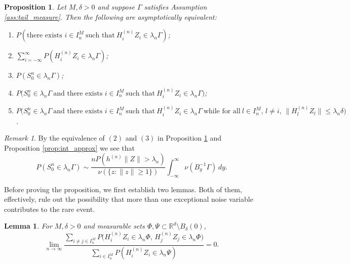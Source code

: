 \documentclass[11pt,reqno]{amsart}
\numberwithin{equation}{section}
\newcommand{\notes}[1]{{\color{brown}  {Notes: #1}}}
\newtheorem{lemma}{Lemma}[section] %
\newtheorem{proposition}{Proposition}
\theoremstyle{definition}
\theoremstyle{remark}
\newtheorem{remark}{Remark}[section]
\theoremstyle{definition}
\newcommand{\RR}{\mathbb{R}}
\begin{document}
\begin{proposition}\label{prop:asym_prob_equi}
   Let \( M, \delta  > 0 \) and suppose $\Gamma$  
satisfies Assumption \ref{ass:tail_measure}. Then the following are
asymptotically equivalent: 



    \begin{enumerate} 
     \item $P(\text{there exists } i \in I_n^M \ \text{such that} \
       H_{i}^{(n)} Z_i \in \lambda_n \Gamma)$; 
        \item $\sum_{i = -\infty}^\infty P(H_{i}^{(n)} Z_i \in
          \lambda_n \Gamma)$; 
        \item $P(S_0^n \in \lambda_n \Gamma) $; 
        \item $P\bigl(S_0^n \in \lambda_n \Gamma \ \text{and there exists }
          i\in I_n^M \ \text{such that} \ H_i^{(n)} Z_i\in \lambda_n
          \Gamma\bigr)$;         
        \item 
$P\bigl(S_0^n \in \lambda_n\Gamma \ \text{and there exists } i\in
I_n^M \ \text{such that} \ H_i^{(n)} Z_i \in \lambda_n \Gamma \ \text{while
  for all} \   l\in I_n^M, \, l\neq i, \, \|H_l^{(n)} Z_l\| \leq \lambda_n
\delta\bigr)$. 
    \end{enumerate}
\end{proposition}

\begin{remark}
By the equivalence of $(2)$ and $(3)$ in Proposition
\ref{prop:asym_prob_equi} and Proposition \ref{prop:int_approx} we see
that 
    \begin{equation}\label{eq:asym_equivalence}
        {P(S_0^n \in \lambda_n \Gamma)} \sim \frac{n P(h^{(n)} \|Z\| >
          \lambda_n)}{\nu(\{z: \|z\|\geq 1\})}  \int_{-\infty}^\infty
        \nu (B_y^{-1}\Gamma) \, dy. 
    \end{equation}
\end{remark}



\medskip


Before proving the proposition, we first establish two lemmas.  Both
of them, effectively, rule out the possibility that more than one
exceptional noise variable contributes to the rare event. 

\begin{lemma}\label{l:elem.fact}
  For $M, \delta>0$ and measurable sets $\Phi, \Psi \subset \RR^d \setminus B_{\delta}(0)$,
\begin{equation} \label{e:two.big.sum}
\lim_{n\to\infty}\frac{\sum_{i \neq j\in I_n^M } P\bigl( H_i^{(n)} Z_i
  \in \lambda_n \Phi, \, H_j^{(n)} Z_j \in \lambda_n \Phi)}{\sum_{i\in I_n^M } P(H_i^{(n)} Z_i \in \lambda_n \Psi)}=0. 
\end{equation}
\end{lemma}
\end{document}
